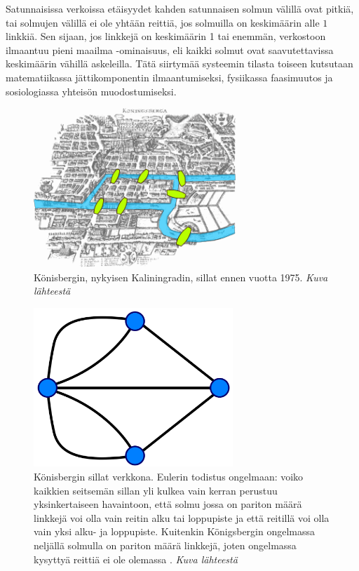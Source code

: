 \documentclass[finnish,12pt,a4paper,pdftex,elec,utf8]{aaltothesis}
\begin{document}
Satunnaisissa verkoissa etäisyydet kahden satunnaisen solmun välillä ovat pitkiä, tai solmujen välillä ei ole yhtään reittiä, jos solmuilla on keskimäärin alle $1$ linkkiä. Sen sijaan, jos linkkejä on keskimäärin 1 tai enemmän, verkostoon ilmaantuu pieni maailma -ominaisuus, eli kaikki solmut ovat saavutettavissa keskimäärin vähillä askeleilla. \cite[24]{Linkit} Tätä siirtymää systeemin tilasta toiseen kutsutaan matematiikassa jättikomponentin ilmaantumiseksi, fysiikassa faasimuutos ja sosiologiassa yhteisön muodostumiseksi.

\begin{figure}[htb]
\centering \includegraphics[height=6cm]{Kuva_Sillat_1}
\caption{Könisbergin, nykyisen Kaliningradin, sillat ennen vuotta 1975. \textit{Kuva lähteestä \cite{Sillat_1}} \label{fig:Sillat_1}}
\end{figure}

\begin{figure}[htb]
\centering \includegraphics[height=6cm]{Kuva_Sillat_3}
\caption{Könisbergin sillat verkkona. Eulerin todistus ongelmaan: voiko kaikkien seitsemän sillan yli kulkea vain kerran perustuu yksinkertaiseen havaintoon, että solmu jossa on pariton määrä linkkejä voi olla vain reitin alku tai loppupiste ja että reitillä voi olla vain yksi alku- ja loppupiste. Kuitenkin Königsbergin ongelmassa neljällä solmulla on pariton määrä linkkejä, joten ongelmassa kysyttyä reittiä ei ole olemassa \cite[17]{Linkit}. \textit{Kuva lähteestä \cite{Sillat_3}} \label{fig:Sillat_3}}
\end{figure}
\end{document}
